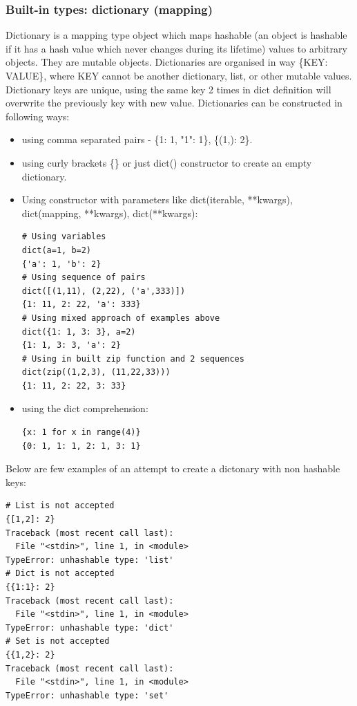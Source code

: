 \documentclass{article}
\begin{document}
	\subsubsection{Built-in types: dictionary (mapping)}
	Dictionary is a mapping type object which maps hashable (an object is hashable if it has a hash value which never changes during its lifetime) values to arbitrary objects. They are mutable objects. Dictionaries are organised in way \{KEY: VALUE\}, where KEY cannot be another dictionary, list, or other mutable values. Dictionary keys are unique, using the same key 2 times in dict definition will overwrite the previously key with new value.
	Dictionaries can be constructed in following ways:
	\begin{itemize}
	\item using comma separated pairs - \{1: 1, "1": 1\}, \{(1,): 2\}.
	\item \raggedright using curly brackets \{\} or just dict() constructor to create an empty dictionary. 
	\item Using constructor with parameters like dict(iterable, **kwargs), dict(mapping, **kwargs), dict(**kwargs):
\begin{lstlisting}[style=pystyle]
# Using variables
dict(a=1, b=2)
{'a': 1, 'b': 2}
# Using sequence of pairs
dict([(1,11), (2,22), ('a',333)])
{1: 11, 2: 22, 'a': 333}
# Using mixed approach of examples above
dict({1: 1, 3: 3}, a=2)
{1: 1, 3: 3, 'a': 2}
# Using in built zip function and 2 sequences
dict(zip((1,2,3), (11,22,33)))
{1: 11, 2: 22, 3: 33}
\end{lstlisting}	
	\item using the dict comprehension:
\begin{lstlisting}[style=pystyle]
{x: 1 for x in range(4)}
{0: 1, 1: 1, 2: 1, 3: 1}
\end{lstlisting}
	\end{itemize}
	Below are few examples of an attempt to create a dictonary with non hashable keys:
\begin{lstlisting}[style=pystyle]
# List is not accepted
{[1,2]: 2}
Traceback (most recent call last):
  File "<stdin>", line 1, in <module>
TypeError: unhashable type: 'list'
# Dict is not accepted
{{1:1}: 2}
Traceback (most recent call last):
  File "<stdin>", line 1, in <module>
TypeError: unhashable type: 'dict'
# Set is not accepted
{{1,2}: 2}
Traceback (most recent call last):
  File "<stdin>", line 1, in <module>
TypeError: unhashable type: 'set'
\end{lstlisting}
\end{document}
